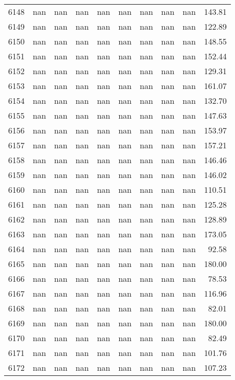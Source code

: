 \begin{tabular}{lrrrrrrrrr}
6148 & nan & nan & nan & nan & nan & nan & nan & nan & 143.81 \\
6149 & nan & nan & nan & nan & nan & nan & nan & nan & 122.89 \\
6150 & nan & nan & nan & nan & nan & nan & nan & nan & 148.55 \\
6151 & nan & nan & nan & nan & nan & nan & nan & nan & 152.44 \\
6152 & nan & nan & nan & nan & nan & nan & nan & nan & 129.31 \\
6153 & nan & nan & nan & nan & nan & nan & nan & nan & 161.07 \\
6154 & nan & nan & nan & nan & nan & nan & nan & nan & 132.70 \\
6155 & nan & nan & nan & nan & nan & nan & nan & nan & 147.63 \\
6156 & nan & nan & nan & nan & nan & nan & nan & nan & 153.97 \\
6157 & nan & nan & nan & nan & nan & nan & nan & nan & 157.21 \\
6158 & nan & nan & nan & nan & nan & nan & nan & nan & 146.46 \\
6159 & nan & nan & nan & nan & nan & nan & nan & nan & 146.02 \\
6160 & nan & nan & nan & nan & nan & nan & nan & nan & 110.51 \\
6161 & nan & nan & nan & nan & nan & nan & nan & nan & 125.28 \\
6162 & nan & nan & nan & nan & nan & nan & nan & nan & 128.89 \\
6163 & nan & nan & nan & nan & nan & nan & nan & nan & 173.05 \\
6164 & nan & nan & nan & nan & nan & nan & nan & nan & 92.58 \\
6165 & nan & nan & nan & nan & nan & nan & nan & nan & 180.00 \\
6166 & nan & nan & nan & nan & nan & nan & nan & nan & 78.53 \\
6167 & nan & nan & nan & nan & nan & nan & nan & nan & 116.96 \\
6168 & nan & nan & nan & nan & nan & nan & nan & nan & 82.01 \\
6169 & nan & nan & nan & nan & nan & nan & nan & nan & 180.00 \\
6170 & nan & nan & nan & nan & nan & nan & nan & nan & 82.49 \\
6171 & nan & nan & nan & nan & nan & nan & nan & nan & 101.76 \\
6172 & nan & nan & nan & nan & nan & nan & nan & nan & 107.23 \\

\end{tabular}
